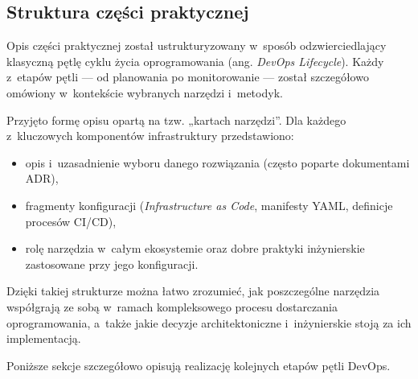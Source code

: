 \subsection{Struktura części praktycznej}
Opis części praktycznej został ustrukturyzowany w~sposób odzwierciedlający klasyczną pętlę cyklu życia oprogramowania (ang. \textit{DevOps Lifecycle}).
Każdy z~etapów pętli --- od planowania po monitorowanie --- został szczegółowo omówiony w~kontekście wybranych narzędzi i~metodyk.

Przyjęto formę opisu opartą na tzw. „kartach narzędzi”. Dla każdego z~kluczowych komponentów infrastruktury przedstawiono:
\begin{itemize}
    \item opis i~uzasadnienie wyboru danego rozwiązania (często poparte dokumentami ADR),
    \item fragmenty konfiguracji (\textit{Infrastructure as Code}, manifesty YAML, definicje procesów CI/CD),
    \item rolę narzędzia w~całym ekosystemie oraz dobre praktyki inżynierskie zastosowane przy jego konfiguracji.
\end{itemize}

Dzięki takiej strukturze można łatwo zrozumieć, jak poszczególne narzędzia współgrają ze sobą w~ramach kompleksowego procesu dostarczania oprogramowania, a~także jakie decyzje architektoniczne i~inżynierskie stoją za ich implementacją.

Poniższe sekcje szczegółowo opisują realizację kolejnych etapów pętli DevOps.
